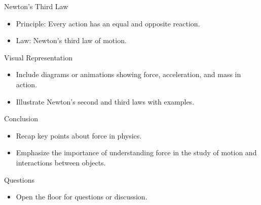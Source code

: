\documentclass{beamer}
\begin{document}
\begin{frame}{Newton's Third Law}
\begin{itemize}
\item Principle: Every action has an equal and opposite reaction.
\item Law: Newton's third law of motion.
\end{itemize}
\end{frame}

\begin{frame}{Visual Representation}
\begin{itemize}
\item Include diagrams or animations showing force, acceleration, and mass in action.
\item Illustrate Newton's second and third laws with examples.
\end{itemize}
\end{frame}

\begin{frame}{Conclusion}
\begin{itemize}
\item Recap key points about force in physics.
\item Emphasize the importance of understanding force in the study of motion and interactions between objects.
\end{itemize}
\end{frame}

\begin{frame}{Questions}
\begin{itemize}
\item Open the floor for questions or discussion.
\end{itemize}
\end{frame}
\end{document}
